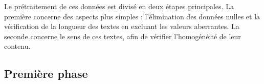Le prétraitement de ces données est divisé en deux étapes principales. La première concerne des aspects plus simples : l'élimination des données nulles et la vérification de la longueur des textes en excluant les valeurs aberrantes. La seconde concerne le sens de ces textes, afin de vérifier l'homogénéité de leur contenu.
\\
\subsection{Première phase}
